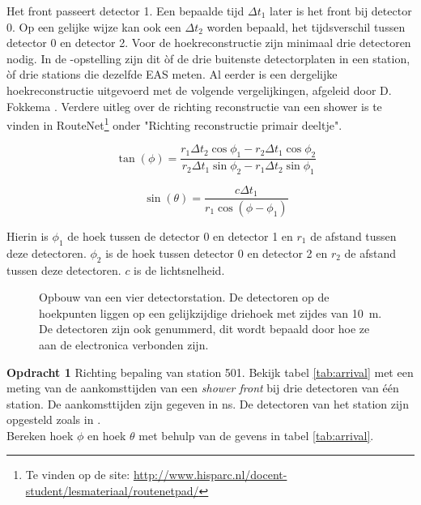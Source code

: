 Het front passeert detector 1. Een bepaalde tijd $\Delta t_1$ later is
het front bij detector 0. Op een gelijke wijze kan ook een $\Delta t_2$
worden bepaald, het tijdsverschil tussen detector 0 en detector 2. Voor
de hoekreconstructie zijn minimaal drie detectoren nodig. In de
\hisparc-opstelling zijn dit òf de drie buitenste detectorplaten in een
station, òf drie stations die dezelfde EAS meten. Al eerder is een
dergelijke hoekreconstructie uitgevoerd met de volgende vergelijkingen,
afgeleid door D. Fokkema \cite{Fokkema}. Verdere uitleg over de richting
reconstructie van een shower is te vinden in
RouteNet\footnote{Te vinden op de site:
\url{http://www.hisparc.nl/docent-student/lesmateriaal/routenetpad/}}
onder "Richting reconstructie primair deeltje".

\begin{equation}
   \quad\tan(\phi) = \frac{r_1\Delta t_2\cos\phi_1-r_2\Delta t_1\cos\phi_2}
                          {r_2\Delta t_1\sin\phi_2-r_1\Delta t_2\sin\phi_1}
\end{equation}

\begin{equation}
    \quad\sin(\theta) = \frac{c\Delta t_1}{r_1\cos(\phi-\phi_1)}
\end{equation}

Hierin is $\phi_1$ de hoek tussen de detector 0 en detector 1 en $r_1$ de
afstand tussen deze detectoren. $\phi_2$ is de hoek tussen detector 0 en
detector 2 en $r_2$ de afstand tussen deze detectoren. $c$ is de
lichtsnelheid.

\begin{figure}
    \centering
    
    \caption{Opbouw van een vier detectorstation. De detectoren op de
             hoekpunten liggen op een gelijkzijdige driehoek met zijdes
             van \SI{10}{\meter}. De detectoren zijn ook genummerd, dit
             wordt bepaald door hoe ze aan de \hisparc electronica
             verbonden zijn.}
    \label{fig:stationlayout} 
\end{figure}

\textbf{Opdracht 1} Richting bepaling van station 501. Bekijk tabel
\ref{tab:arrival} met een meting van de aankomsttijden van een
\emph{shower front} bij drie detectoren van één station. De
aankomsttijden zijn gegeven in ns. De detectoren van het station zijn
opgesteld zoals in .\\
Bereken hoek $\phi$ en hoek $\theta$ met behulp van de gevens in tabel
\ref{tab:arrival}.

